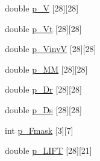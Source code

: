 \begin{DoxyCompactItemize}
\item 
double \hyperlink{a00461_a3e85a3e21bdbfabd25d6f58348485039}{p\+\_\+V} \mbox{[}28\mbox{]}\mbox{[}28\mbox{]}
\item 
double \hyperlink{a00461_a0c4d78753e5f8f5beb51e7858f4e2dcc}{p\+\_\+\+Vt} \mbox{[}28\mbox{]}\mbox{[}28\mbox{]}
\item 
double \hyperlink{a00461_a317c2a41984fddb8c19eb2ee99e8fea5}{p\+\_\+\+VinvV} \mbox{[}28\mbox{]}\mbox{[}28\mbox{]}
\item 
double \hyperlink{a00461_afe5f9353c0b274c0af00660b5538da55}{p\+\_\+\+MM} \mbox{[}28\mbox{]}\mbox{[}28\mbox{]}
\item 
double \hyperlink{a00461_a10d32d84835abfa5a43ca05bb5157623}{p\+\_\+\+Dr} \mbox{[}28\mbox{]}\mbox{[}28\mbox{]}
\item 
double \hyperlink{a00461_a12faa16cf926b3799b733b5da2993946}{p\+\_\+\+Ds} \mbox{[}28\mbox{]}\mbox{[}28\mbox{]}
\item 
int \hyperlink{a00461_a6b18ffc6e470dc9d5903792503239300}{p\+\_\+\+Fmask} \mbox{[}3\mbox{]}\mbox{[}7\mbox{]}
\item 
double \hyperlink{a00461_a21d80bf79d58fbc86b7f27d5c4a7e305}{p\+\_\+\+L\+I\+FT} \mbox{[}28\mbox{]}\mbox{[}21\mbox{]}
\item 

\end{DoxyCompactItemize}
